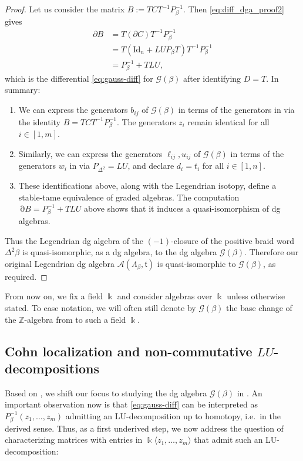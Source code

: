 \documentclass[11pt]{article}
\newcommand{\kk}{\Bbbk}
\newcommand{\ZZ}{\mathbb Z}
\newcommand{\La}{\Lambda}
\newcommand{\SA}{\mathcal A}
\newcommand{\ST}{\mathfrak t}
\newcommand{\cG}{\mathcal G}
\newcommand{\dd}{\operatorname{\partial}}
\begin{document}
\begin{proof}
Let us consider the matrix $B:=TCT^{-1}P_\beta^{-1}$. Then \eqref{eq:diff_dga_proof2} gives
\begin{align*}
 \partial B
 &=T(\partial C)T^{-1}P_\beta^{-1}\\
 &=T(\mbox{Id}_n+LUP_\beta T)T^{-1}P_\beta^{-1}\\
 &=P_\beta^{-1}+TLU,
 \end{align*}
which is the differential \eqref{eq:gauss-diff} for $\cG(\beta)$ after identifying $D=T$. In summary:
\begin{enumerate}[label=$(\roman*)$]
    \item We can express the generators $b_{ij}$ of $\cG(\beta)$ in terms of the generators in  via the identity $B=TCT^{-1}P_\beta^{-1}$. The generators $z_i$ remain identical for all $i\in[1,m]$.

    \item Similarly, we can express the generators $\ell_{ij},u_{ij}$ of $\cG(\beta)$ in terms of the generators $w_i$ in  via $P_{\Delta^2}=LU$, and declare $d_i=t_i$ for all $i\in[1,n]$.

    \item These identifications above, along with the Legendrian isotopy, define a stable-tame equivalence of graded algebras. The computation $\dd B=P_\beta^{-1}+TLU$ above shows that it induces a quasi-isomorphism of dg algebras.
\end{enumerate}
Thus the Legendrian dg algebra of the $(-1)$-closure of the positive braid word $\Delta^2\beta$ is quasi-isomorphic, as a dg algebra, to the dg algebra $\cG(\beta)$. Therefore our original Legendrian dg algebra $\SA(\La_\beta,\ST)$ is quasi-isomorphic to $\cG(\beta)$, as required.
\end{proof}

\noindent From now on, we fix a field $\kk$ and consider algebras over $\kk$ unless otherwise stated. To ease notation, we will often still denote by $\cG(\beta)$ the base change of the $\ZZ$-algebra from  to such a field $\kk$.


\subsection{ Cohn localization and non-commutative $LU$-decompositions}\label{ssec:Cohn_loc_Gauss_dec}
Based on , we shift our focus to studying the dg algebra $\cG(\beta)$ in . An important observation now is that \eqref{eq:gauss-diff} can be interpreted as $P_\beta^{-1}(z_1,\ldots,z_m)$ admitting an LU-decomposition up to homotopy, i.e.~in the derived sense. Thus, as a first underived step, we now address the question of characterizing matrices with entries in $\kk\langle z_1,\ldots,z_m\rangle$ that admit such an LU-decomposition:
\end{document}
